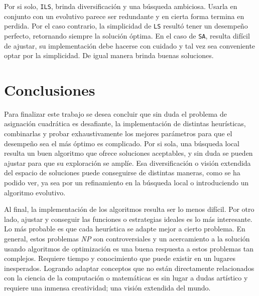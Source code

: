 Por si solo, \texttt{ILS}, brinda diversificación y una búsqueda ambiciosa. Usarla en conjunto con un evolutivo parece ser redundante y en cierta forma termina en perdida. Por el caso contrario, la simplicidad de \texttt{LS} resultó tener un desempeño perfecto, retornando siempre la solución óptima. En el caso de \texttt{SA}, resulta difícil de ajustar, su implementación debe hacerse con cuidado y tal vez sea conveniente optar por la simplicidad. De igual manera brinda buenas soluciones. 

\newpage

\section*{Conclusiones}

Para finalizar este trabajo se desea concluir que sin duda el problema de asignación cuadrática es desafiante, la implementación de distintas heurísticas, combinarlas y probar exhaustivamente los mejores parámetros para que el desempeño sea el más óptimo es complicado. Por si sola, una búsqueda local resulta un buen algoritmo que ofrece soluciones aceptables, y sin duda se pueden ajustar para que su exploración se amplíe. Esa diversificación o visión extendida del espacio de soluciones puede conseguirse de distintas maneras, como se ha podido ver, ya sea por un refinamiento en la búsqueda local o introduciendo un algoritmo evolutivo.

Al final, la implementación de los algoritmos resulta ser lo menos difícil. Por otro lado, ajustar y conseguir las funciones o estrategias ideales es lo más interesante. Lo más probable es que cada heurística se adapte mejor a cierto problema. En general, estos problemas \emph{NP} son controversiales y un acercamiento a la solución usando algoritmos de optimización es una buena respuesta a estos problemas tan complejos. Requiere tiempo y conocimiento que puede existir en un lugares inesperados. Logrando adaptar conceptos que no están directamente relacionados con la ciencia de la computación o matemáticas es sin lugar a dudas artístico y requiere una inmensa creatividad; una visión extendida del mundo. 

\newpage

\printbibliography
\thispagestyle{bibfooter}



